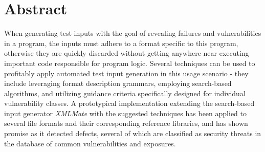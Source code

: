 \section*{Abstract}
When generating test inputs with the goal of revealing failures and vulnerabilities in a program, 
the inputs must adhere to a format specific to this program, otherwise they are 
quickly discarded without getting anywhere near executing important code responsible for program logic.
Several techniques can be used to profitably apply automated test input generation in this usage scenario -
they include leveraging format description grammars, employing search-based algorithms,
and utilizing guidance criteria specifically designed for individual vulnerability classes.
A prototypical implementation extending the search-based input generator \emph{XMLMate} with the suggested
techniques has been applied to several file formats and their corresponding reference libraries, and has shown
promise as it detected defects, several of which are classified as security threats in the database of common
vulnerabilities and exposures. 
